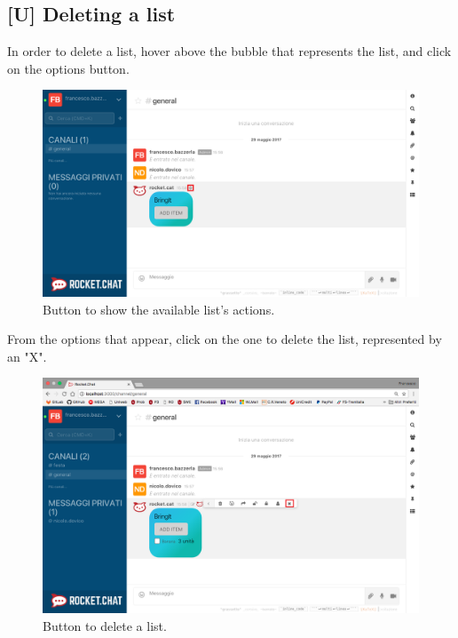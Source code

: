 \newpage
\subsection{[U] Deleting a list}
In order to delete a list, hover above the bubble that represents the list, and click on the options button.

\begin{figure}[H]
  \centering 
  \includegraphics[width=\textwidth]{Sections/3-HowToUse/Images/bubble_options_button.png}
  \caption{Button to show the available list's actions.}
\end{figure}

From the options that appear, click on the one to delete the list, represented by an "X".

\begin{figure}[H]
  \centering 
  \includegraphics[width=\textwidth]{Sections/3-HowToUse/Images/bubble_option_delete.png}
  \caption{Button to delete a list.}
\end{figure}

